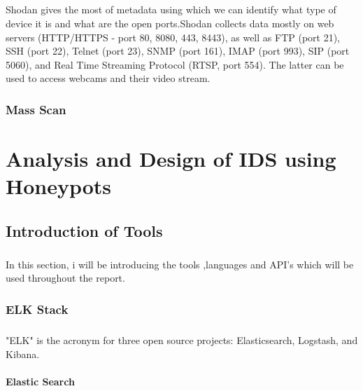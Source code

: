 \documentclass{report}
\begin{document}
\paragraph{}
Shodan gives the most of metadata using which we can identify what type of device it is and what are the open ports.Shodan collects data mostly on web servers (HTTP/HTTPS - port 80, 8080, 443, 8443), as well as FTP (port 21), SSH (port 22), Telnet (port 23), SNMP (port 161), IMAP (port 993), SIP (port 5060), and Real Time Streaming Protocol (RTSP, port 554). The latter can be used to access webcams and their video stream.


\subsection{Mass Scan}














\chapter{Analysis and Design of IDS using Honeypots}

\section{Introduction of Tools}

\paragraph{}
In this section, i will be introducing the tools ,languages and API's which will be used throughout the report.

\subsection{ELK Stack}
\paragraph{}
"ELK" is the acronym for three open source projects: Elasticsearch, Logstash, and Kibana.

\subsubsection{Elastic Search}
\end{document}
